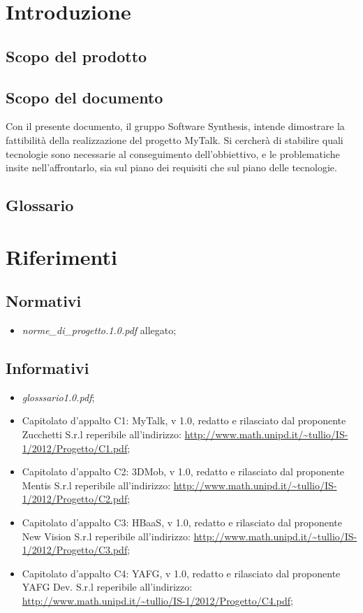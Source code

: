 

\setcounter{page}{1}
\pagestyle{normal}


\section{Introduzione}
\subsection{Scopo del prodotto}
\purpose
\subsection{Scopo del documento}
Con il presente documento, il gruppo Software Synthesis, intende dimostrare la fattibilità della realizzazione del progetto MyTalk. Si cercherà di stabilire quali tecnologie sono necessarie al conseguimento dell'obbiettivo, e le problematiche insite nell'affrontarlo, sia sul piano dei requisiti che sul piano delle tecnologie.
\subsection{Glossario}
\glossaryIntro
\clearpage

\section{Riferimenti}
\subsection{Normativi}
\begin{itemize}
\item[] \textit{norme\_di\_progetto.1.0.pdf} allegato;
\end{itemize}
\subsection{Informativi}
\begin{itemize}
\item[] \textit{glosssario1.0.pdf};
\item[] Capitolato d'appalto C1: MyTalk, v 1.0, redatto e rilasciato dal proponente Zucchetti S.r.l reperibile all'indirizzo: \url{http://www.math.unipd.it/~tullio/IS-1/2012/Progetto/C1.pdf};
\item[] Capitolato d'appalto C2: 3DMob, v 1.0, redatto e rilasciato dal proponente Mentis S.r.l reperibile all'indirizzo: \url{http://www.math.unipd.it/~tullio/IS-1/2012/Progetto/C2.pdf};
\item[] Capitolato d'appalto C3: HBaaS, v 1.0, redatto e rilasciato dal proponente New Vision S.r.l reperibile all'indirizzo: \url{http://www.math.unipd.it/~tullio/IS-1/2012/Progetto/C3.pdf};
\item[] Capitolato d'appalto C4: YAFG, v 1.0, redatto e rilasciato dal proponente YAFG Dev. S.r.l reperibile all'indirizzo: \url{http://www.math.unipd.it/~tullio/IS-1/2012/Progetto/C4.pdf};
\end{itemize}
\clearpage
